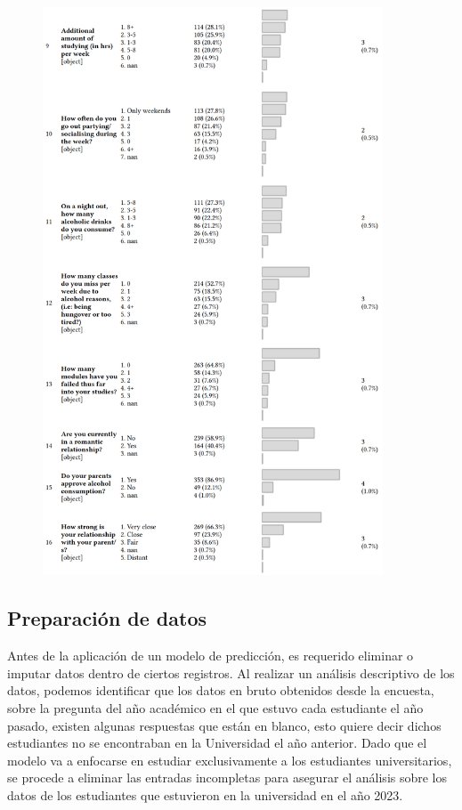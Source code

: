 \documentclass[a4paper,12pt]{article}
\begin{document}
\begin{figure}[H]
  \centering
  \includegraphics[width=0.9\textwidth]{Tabla2.png}
\end{figure}

\subsection{Preparación de datos}
Antes de la aplicación de un modelo de predicción, es requerido eliminar o imputar datos dentro de ciertos registros. Al realizar un análisis descriptivo de los datos, podemos identificar que los datos en bruto obtenidos desde la encuesta, sobre la pregunta del año académico en el que estuvo cada estudiante el año pasado, existen algunas respuestas que están en blanco, esto quiere decir dichos estudiantes no se encontraban en la Universidad el año anterior. Dado que el modelo va a enfocarse en estudiar exclusivamente a los estudiantes universitarios, se procede a eliminar las entradas incompletas para asegurar el análisis sobre los datos de los estudiantes que estuvieron en la universidad en el año 2023.
\end{document}

